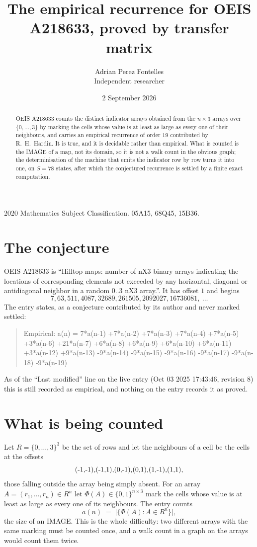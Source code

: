 \documentclass[11pt,a4paper]{article}
\title{The empirical recurrence for OEIS A218633, proved by transfer matrix}
\author{Adrian Perez Fontelles\\ \small Independent researcher}
\date{2 September 2026}
\theoremstyle{plain}
\theoremstyle{definition}
\begin{document}
\maketitle

\begin{abstract}
OEIS A218633 counts the distinct indicator arrays obtained from the $n\times3$ arrays over
$\{0,\dots,3\}$ by marking the cells whose value is at least as large as every one of their neighbours, and carries an
empirical recurrence of order $19$ contributed by R.~H.~Hardin. It is true, and it is
decidable rather than empirical. What is counted is the IMAGE of a map, not its domain, so it
is not a walk count in the obvious graph; the determinisation of the machine that emits the
indicator row by row turns it into one, on $S=78$ states, after which the conjectured
recurrence is settled by a finite exact computation.
\end{abstract}

\noindent\small 2020 Mathematics Subject Classification. 05A15, 68Q45, 15B36.\normalsize

\section{The conjecture}

OEIS A218633 is ``Hilltop maps: number of nX3 binary arrays indicating the locations of corresponding elements not exceeded by any horizontal, diagonal or antidiagonal neighbor in a random 0..3 nX3 array.''. It has offset $1$ and begins
\[
7, 63, 511, 4087, 32689, 261505, 2092027, 16736081,\ \dots
\]
The entry states, as a conjecture contributed by its author and never marked settled:
\begin{quote}
Empirical: a(n) = 7*a(n-1) +7*a(n-2) +7*a(n-3) +7*a(n-4) +7*a(n-5) +3*a(n-6) +21*a(n-7) +6*a(n-8) +6*a(n-9) +6*a(n-10) +6*a(n-11) +3*a(n-12) +9*a(n-13) -9*a(n-14) -9*a(n-15) -9*a(n-16) -9*a(n-17) -9*a(n-18) -9*a(n-19)
\end{quote}
As of the ``Last modified'' line on the live entry (Oct 03 2025 17:43:46, revision 8) this is still
recorded as empirical, and nothing on the entry records it as proved.

\section{What is being counted}

Let $R=\{0,\dots,3\}^{3}$ be the set of rows and let the neighbours of a cell be the
cells at the offsets
\[
$(-1,-1)$, $(-1,1)$, $(0,-1)$, $(0,1)$, $(1,-1)$, $(1,1)$,
\]
those falling outside the array being simply absent. For an array
$A=(r_1,\dots,r_n)\in R^n$ let $\Phi(A)\in\{0,1\}^{n\times3}$ mark the cells whose value
is at least as large as every one of its neighbours. The entry counts
\[
a(n)\;=\;\bigl|\{\Phi(A):A\in R^n\}\bigr| ,
\]
the size of an IMAGE. This is the whole difficulty: two different arrays with the same marking
must be counted once, and a walk count in a graph on the arrays would count them twice.
\end{document}
